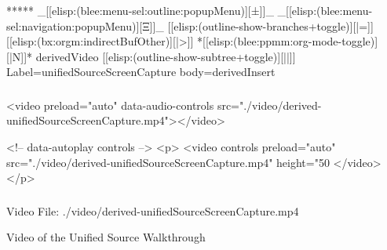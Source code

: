 \begin{whenOrg}
\begin{whenOrg}
*****  _[[elisp:(blee:menu-sel:outline:popupMenu)][±]]_ _[[elisp:(blee:menu-sel:navigation:popupMenu)][Ξ]]_ [[elisp:(outline-show-branches+toggle)][|=]] [[elisp:(bx:orgm:indirectBufOther)][|>]] *[[elisp:(blee:ppmm:org-mode-toggle)][|N]]*  derivedVideo [[elisp:(outline-show-subtree+toggle)][||]] Label=unifiedSourceScreenCapture  body=derivedInsert
\end{whenOrg}

\begin{htmlonly}

\begin{frame}[fragile,plain,label=unifiedSourceScreenCapture]
    \frametitle{}
    \framesubtitle{}
    \begin{presentationMode}
    \begin{rawhtml}
<video preload="auto" data-audio-controls src="./video/derived-unifiedSourceScreenCapture.mp4"></video>
    \end{rawhtml}
    \end{presentationMode}

    \begin{articleMode}
    \begin{rawhtml}
    <!-- data-autoplay  controls -->
    <p>
    <video controls  preload="auto" src="./video/derived-unifiedSourceScreenCapture.mp4" height="50%
    </video>
    </p>
     \end{rawhtml}
    \end{articleMode}
\end{frame}
\end{htmlonly}

\begin{verblatex}

\begin{frame}[fragile,plain,label=unifiedSourceScreenCapture]
    \frametitle{}
    \framesubtitle{}

    Video File: ./video/derived-unifiedSourceScreenCapture.mp4

    Video of the Unified Source Walkthrough




\end{frame}
\end{verblatex}
\end{whenOrg}
